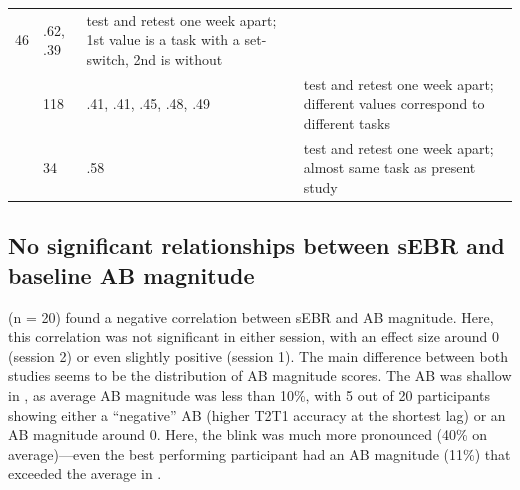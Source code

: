 \documentclass[11pt,]{memoir}
\begin{document}
\begin{longtable}[]{@{}llll@{}}
\begin{minipage}[t]{0.03\columnwidth}
46\strut
\end{minipage} & \begin{minipage}[t]{0.15\columnwidth}\raggedright
.62, .39\strut
\end{minipage} & \begin{minipage}[t]{0.51\columnwidth}\raggedright
test and retest one week apart; 1st value is a task with a set-switch, 2nd is without\strut
\end{minipage}\tabularnewline
\begin{minipage}[t]{0.19\columnwidth}\raggedright
\textcite{Dale2013}\strut
\end{minipage} & \begin{minipage}[t]{0.03\columnwidth}\raggedright
118\strut
\end{minipage} & \begin{minipage}[t]{0.15\columnwidth}\raggedright
.41, .41, .45, .48, .49\strut
\end{minipage} & \begin{minipage}[t]{0.51\columnwidth}\raggedright
test and retest one week apart; different values correspond to different tasks\strut
\end{minipage}\tabularnewline
\begin{minipage}[t]{0.19\columnwidth}\raggedright
\textcite{London2015}\strut
\end{minipage} & \begin{minipage}[t]{0.03\columnwidth}\raggedright
34\strut
\end{minipage} & \begin{minipage}[t]{0.15\columnwidth}\raggedright
.58\strut
\end{minipage} & \begin{minipage}[t]{0.51\columnwidth}\raggedright
test and retest one week apart; almost same task as present study\strut
\end{minipage}\tabularnewline
\bottomrule
\end{longtable}

\hypertarget{no-significant-relationships-between-sebr-and-baseline-ab-magnitude}{%
\subsection{No significant relationships between sEBR and baseline AB magnitude}\label{no-significant-relationships-between-sebr-and-baseline-ab-magnitude}}

\textcite{Colzato2008} (n = 20) found a negative correlation between sEBR and AB magnitude. Here, this correlation was not significant in either session, with an effect size around 0 (session 2) or even slightly positive (session 1). The main difference between both studies seems to be the distribution of AB magnitude scores. The AB was shallow in \textcite{Colzato2008}, as average AB magnitude was less than 10\%, with 5 out of 20 participants showing either a ``negative'' AB (higher T2\textbar{}T1 accuracy at the shortest lag) or an AB magnitude around 0. Here, the blink was much more pronounced (40\% on average)---even the best performing participant had an AB magnitude (11\%) that exceeded the average in \textcite{Colzato2008}.
\end{document}
